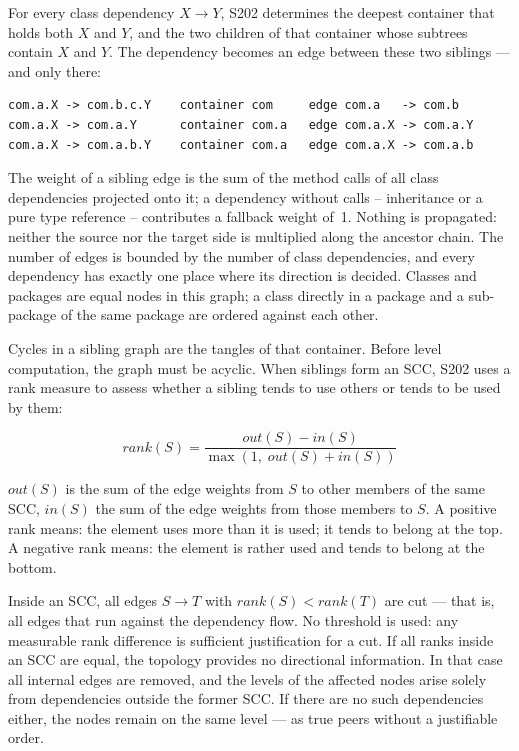 \documentclass[a4paper,11pt]{article}
\begin{document}
For every class dependency $X \to Y$, S202 determines the deepest container
that holds both $X$ and $Y$, and the two children of that container whose
subtrees contain $X$ and $Y$. The dependency becomes an edge between these two
siblings — and only there:

\begin{lstlisting}
com.a.X -> com.b.c.Y    container com     edge com.a   -> com.b
com.a.X -> com.a.Y      container com.a   edge com.a.X -> com.a.Y
com.a.X -> com.a.b.Y    container com.a   edge com.a.X -> com.a.b
\end{lstlisting}

The weight of a sibling edge is the sum of the method calls of all class
dependencies projected onto it; a dependency without calls -- inheritance or a
pure type reference -- contributes a fallback weight of~1. Nothing is propagated: neither the source nor the target
side is multiplied along the ancestor chain. The number of edges is bounded by
the number of class dependencies, and every dependency has exactly one place
where its direction is decided. Classes and packages are equal nodes in this
graph; a class directly in a package and a sub-package of the same package are
ordered against each other.

Cycles in a sibling graph are the tangles of that container. Before level
computation, the graph must be acyclic. When siblings form an SCC, S202 uses a
rank measure to assess whether a sibling tends to use others or tends to be
used by them:

\[
  rank(S) = \frac{out(S) - in(S)}{\max(1,\; out(S) + in(S))}
\]

$out(S)$ is the sum of the edge weights from $S$ to other members of the same
SCC, $in(S)$ the sum of the edge weights from those members to $S$. A positive
rank means: the element uses more than it is used; it tends to belong at the
top. A negative rank means: the element is rather used and tends to belong at
the bottom.

Inside an SCC, all edges $S \to T$ with $rank(S) < rank(T)$ are cut — that
is, all edges that run against the dependency flow. No threshold is used: any
measurable rank difference is sufficient justification for a cut. If all ranks
inside an SCC are equal, the topology provides no directional information. In
that case all internal edges are removed, and the levels of the affected nodes
arise solely from dependencies outside the former SCC. If there are no such
dependencies either, the nodes remain on the same level — as true peers
without a justifiable order.
\end{document}
